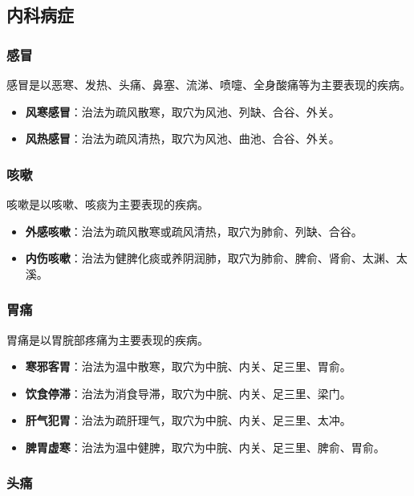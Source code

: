 \documentclass[12pt,UTF8]{ctexbook}
\begin{document}
\subsection{内科病症}

\subsubsection{感冒}

感冒是以恶寒、发热、头痛、鼻塞、流涕、喷嚏、全身酸痛等为主要表现的疾病。

\begin{itemize}
\item \textbf{风寒感冒}：治法为疏风散寒，取穴为风池、列缺、合谷、外关。
\item \textbf{风热感冒}：治法为疏风清热，取穴为风池、曲池、合谷、外关。
\end{itemize}

\subsubsection{咳嗽}

咳嗽是以咳嗽、咳痰为主要表现的疾病。

\begin{itemize}
\item \textbf{外感咳嗽}：治法为疏风散寒或疏风清热，取穴为肺俞、列缺、合谷。
\item \textbf{内伤咳嗽}：治法为健脾化痰或养阴润肺，取穴为肺俞、脾俞、肾俞、太渊、太溪。
\end{itemize}

\subsubsection{胃痛}

胃痛是以胃脘部疼痛为主要表现的疾病。

\begin{itemize}
\item \textbf{寒邪客胃}：治法为温中散寒，取穴为中脘、内关、足三里、胃俞。
\item \textbf{饮食停滞}：治法为消食导滞，取穴为中脘、内关、足三里、梁门。
\item \textbf{肝气犯胃}：治法为疏肝理气，取穴为中脘、内关、足三里、太冲。
\item \textbf{脾胃虚寒}：治法为温中健脾，取穴为中脘、内关、足三里、脾俞、胃俞。
\end{itemize}

\subsubsection{头痛}
\end{document}
